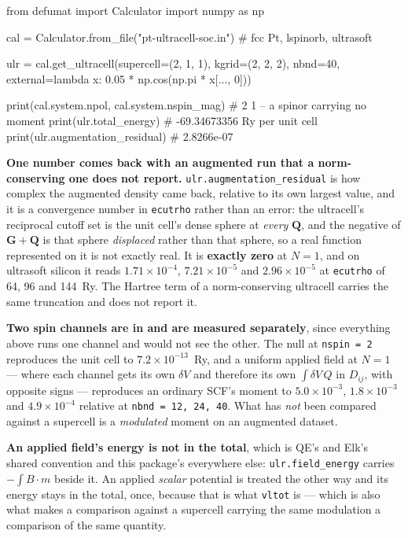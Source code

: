 \documentclass[11pt,a4paper]{article}
\newcommand{\code}[1]{\texttt{\small #1}}
\begin{document}
\begin{pycode}
from defumat import Calculator
import numpy as np

cal = Calculator.from_file("pt-ultracell-soc.in")   # fcc Pt, lspinorb, ultrasoft

ulr = cal.get_ultracell(supercell=(2, 1, 1), kgrid=(2, 2, 2), nbnd=40,
                        external=lambda x: 0.05 * np.cos(np.pi * x[..., 0]))

print(cal.system.npol, cal.system.nspin_mag)  # 2 1 -- a spinor carrying no moment
print(ulr.total_energy)                       # -69.34673356 Ry per unit cell
print(ulr.augmentation_residual)              # 2.8266e-07
\end{pycode}

\textbf{One number comes back with an augmented run that a norm-conserving one
does not report.} \code{ulr.augmentation\_residual} is how complex the augmented
density came back, relative to its own largest value, and it is a convergence
number in \code{ecutrho} rather than an error: the ultracell's reciprocal cutoff
set is the unit cell's dense sphere at \emph{every} $\mathbf Q$, and the negative
of $\mathbf G + \mathbf Q$ is that sphere \emph{displaced} rather than that
sphere, so a real function represented on it is not exactly real. It is
\textbf{exactly zero} at $N=1$, and on ultrasoft silicon it reads
$1.71\times10^{-4}$, $7.21\times10^{-5}$ and $2.96\times10^{-5}$ at
\code{ecutrho} of 64, 96 and 144~Ry. The Hartree term of a norm-conserving
ultracell carries the same truncation and does not report it.

\textbf{Two spin channels are in and are measured separately}, since everything
above runs one channel and would not see the other. The null at \code{nspin = 2}
reproduces the unit cell to $7.2\times10^{-13}$~Ry, and a uniform applied field at
$N=1$ --- where each channel gets its own $\delta V$ and therefore its own
$\int \delta V\,Q$ in $D_{ij}$, with opposite signs --- reproduces an ordinary
SCF's moment to $5.0\times10^{-3}$, $1.8\times10^{-3}$ and $4.9\times10^{-4}$
relative at \code{nbnd = 12, 24, 40}. What has \emph{not} been compared against a
supercell is a \emph{modulated} moment on an augmented dataset.

\textbf{An applied field's energy is not in the total}, which is QE's and Elk's
shared convention and this package's everywhere else: \code{ulr.field\_energy}
carries $-\int B\cdot m$ beside it. An applied \emph{scalar} potential is
treated the other way and its energy stays in the total, once, because that is
what \code{vltot} is --- which is also what makes a comparison against a
supercell carrying the same modulation a comparison of the same quantity.
\end{document}
